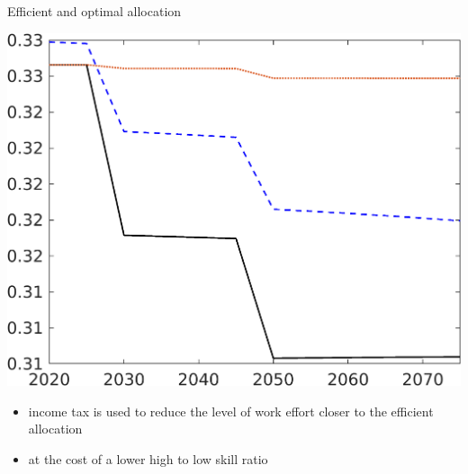 \documentclass[11pt,aspectratio=169]{beamer}
\begin{document}
\begin{frame}{Efficient and optimal allocation }
\begin{minipage}[]{0.32\textwidth}
	\end{minipage}
\begin{minipage}[]{0.32\textwidth}
	\includegraphics[width=1\textwidth]{../codding_model/own_basedOnFried/optimalPol_elastS_DisuSci/figures/all_1705/hl_CompEffOPT_T_NoTaus_spillover0_sep1_BN0_ineq0_red0_etaa0.79_lgd0.png}
\end{minipage}
\begin{itemize}
	\item income tax is used to reduce the level of work effort closer to the efficient allocation
	\item at the cost of a lower high to low skill ratio
\end{itemize}
\end{frame}
\end{document}
